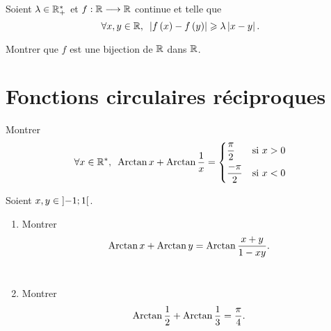 \begin{corr}
\end{corr}

\begin{exo}[Exercice 18]
Soient \(\lambda\in\mathbb{R}_+^*\) et \(f:\mathbb{R}\longrightarrow\mathbb{R}\) continue et telle que \[\quantifs{\forall x,y\in\R}\abs{f\paren{x}-f\paren{y}}\geq\lambda\abs{x-y}.\]

Montrer que \(f\) est une bijection de \(\mathbb{R}\) dans \(\mathbb{R}\).
\end{exo}

\begin{corr}
\end{corr}

\section{Fonctions circulaires réciproques}

\begin{exo}[Exercice 19]
Montrer \[\quantifs{\forall x\in\Rs}\Arctan x+\Arctan\dfrac{1}{x}=\begin{dcases}\dfrac{\pi}{2} &\text{si }x>0 \\ \dfrac{-\pi}{2} &\text{si }x<0\end{dcases}\]
\end{exo}

\begin{corr}
\end{corr}

\begin{exo}[Exercice 20]
Soient \(x,y\in\left]-1;1\right[\).

\begin{enumerate}
\item Montrer \[\operatorname{Arctan} x+\operatorname{Arctan} y=\operatorname{Arctan}\dfrac{x+y}{1-xy}.\] \\

\item Montrer \[\operatorname{Arctan}\dfrac{1}{2}+\operatorname{Arctan}\dfrac{1}{3}=\dfrac{\pi}{4}.\]
\end{enumerate}
\end{exo}

\begin{corr}
\end{corr}

